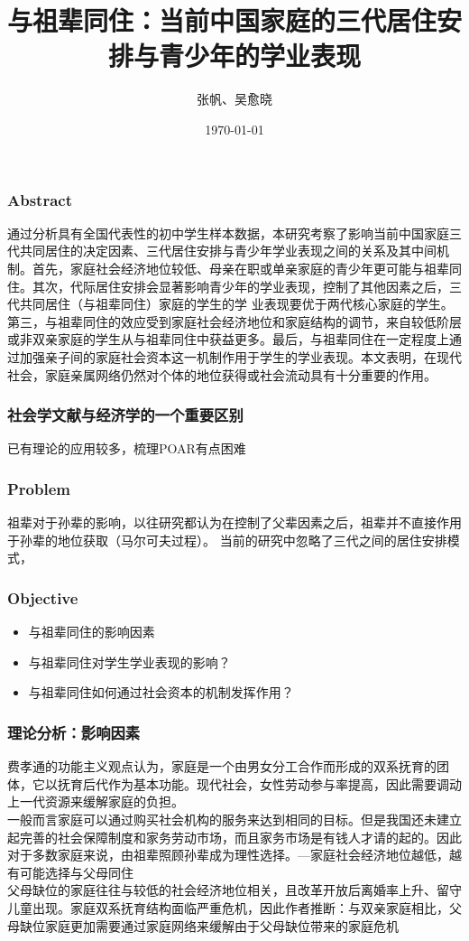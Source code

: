 \documentclass{beamer}
\title[文献分享:ZY]{与祖辈同住：当前中国家庭的三代居住安排与青少年的学业表现}
\author[张帆、吴愈晓]{张帆、吴愈晓}
\date{\today}
\begin{document}
\frame{\titlepage}



\begin{frame}
\frametitle{Abstract}
通过分析具有全国代表性的初中学生样本数据，本研究考察了影响当前中国家庭三代共同居住的决定因素、三代居住安排与青少年学业表现之间的关系及其中间机制。首先，家庭社会经济地位较低、母亲在职或单亲家庭的青少年更可能与祖辈同住。其次，代际居住安排会显著影响青少年的学业表现，控制了其他因素之后，三代共同居住（与祖辈同住）家庭的学生的学 业表现要优于两代核心家庭的学生。 第三，与祖辈同住的效应受到家庭社会经济地位和家庭结构的调节，来自较低阶层或非双亲家庭的学生从与祖辈同住中获益更多。最后，与祖辈同住在一定程度上通过加强亲子间的家庭社会资本这一机制作用于学生的学业表现。本文表明，在现代社会，家庭亲属网络仍然对个体的地位获得或社会流动具有十分重要的作用。


\end{frame}
\begin{frame}
	\frametitle{社会学文献与经济学的一个重要区别}
	已有理论的应用较多，梳理POAR有点困难
\end{frame}



\begin{frame}
\frametitle{Problem}
祖辈对于孙辈的影响，以往研究都认为在控制了父辈因素之后，祖辈并不直接作用于孙辈的地位获取（马尔可夫过程）。
当前的研究中忽略了三代之间的居住安排模式，
\end{frame}


\begin{frame}
\frametitle{Objective}
\begin{itemize}
	\item 与祖辈同住的影响因素	
	\item 与祖辈同住对学生学业表现的影响？
	\item 与祖辈同住如何通过社会资本的机制发挥作用？
\end{itemize}
\end{frame}


\begin{frame}
	\frametitle{理论分析：影响因素}
	费孝通的功能主义观点认为，家庭是一个由男女分工合作而形成的双系抚育的团体，它以抚育后代作为基本功能。现代社会，女性劳动参与率提高，因此需要调动上一代资源来缓解家庭的负担。
	\\ 一般而言家庭可以通过购买社会机构的服务来达到相同的目标。但是我国还未建立起完善的社会保障制度和家务劳动市场，而且家务市场是有钱人才请的起的。因此对于多数家庭来说，由祖辈照顾孙辈成为理性选择。---家庭社会经济地位越低，越有可能选择与父母同住
	\\ 父母缺位的家庭往往与较低的社会经济地位相关，且改革开放后离婚率上升、留守儿童出现。家庭双系抚育结构面临严重危机，因此作者推断：与双亲家庭相比，父母缺位家庭更加需要通过家庭网络来缓解由于父母缺位带来的家庭危机
\end{frame}
\end{document}
